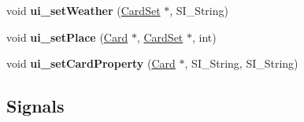 \begin{DoxyCompactItemize}
void {\bfseries ui\+\_\+set\+Weather} (\hyperlink{class_card_set}{Card\+Set} $\ast$, S\+I\+\_\+\+String)
\item 
\mbox{\label{class_field_a30af11dcca425445994054ee372893df}} 
void {\bfseries ui\+\_\+set\+Place} (\hyperlink{class_card}{Card} $\ast$, \hyperlink{class_card_set}{Card\+Set} $\ast$, int)
\item 
\mbox{\label{class_field_a33fb076e39646641330f218f794d2b7e}} 
void {\bfseries ui\+\_\+set\+Card\+Property} (\hyperlink{class_card}{Card} $\ast$, S\+I\+\_\+\+String, S\+I\+\_\+\+String)
\end{DoxyCompactItemize}
\subsection*{Signals}

